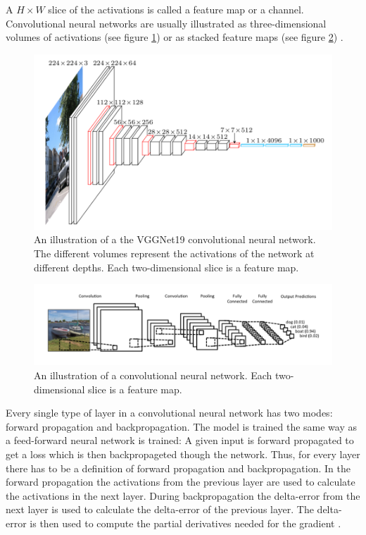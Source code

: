 \documentclass[a4paper, twoside]{article}
\begin{document}
A $H \times W$ slice of the activations is called a feature map or a channel. Convolutional neural networks are usually illustrated as three-dimensional volumes of activations (see figure \ref{figvgg}) or as stacked feature maps (see figure \ref{figboatcnn}) \cite{cs231n} \cite{convmath} \cite{convarithmetic}. 

\begin{figure}[h]
	\centering
  		\includegraphics[scale=0.6]{vggnet.png}
  	\caption{An illustration \cite{vgg} of a the VGGNet19 convolutional neural network. The different volumes represent the activations of the network at different depths. Each two-dimensional slice is a feature map.} \label{figvgg}
\end{figure}

\begin{figure}[h]
	\centering
  		\includegraphics[scale=0.6]{boatcnn.png}
  	\caption{An illustration \cite{figkonv} of a convolutional neural network. Each two-dimensional slice is a feature map.}\label{figboatcnn}
\end{figure}

Every single type of layer in a convolutional neural network has two modes: forward propagation and backpropagation. The model is trained the same way as a feed-forward neural network is trained: A given input is forward propagated to get a loss which is then backpropageted though the network. Thus, for every layer there has to be a definition of forward propagation and backpropagation. In the forward propagation the activations from the previous layer are used to calculate the activations in the next layer. During backpropagation the delta-error from the next layer is used to calculate the delta-error of the previous layer. The delta-error is then used to compute the partial derivatives needed for the gradient \cite{cs231n} \cite{convmath}. 
\end{document}
